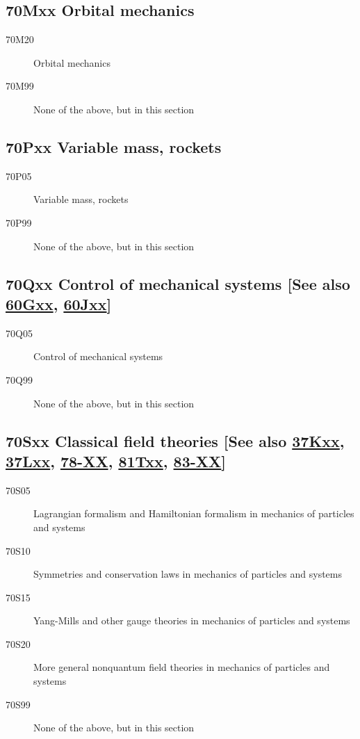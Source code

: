 \subsection*{70Mxx  Orbital mechanics }\label{70Mxx}
\begin{description}  
\item [70M20]\label{70M20} Orbital mechanics
\item [70M99]\label{70M99} None of the above, but in this section
\end{description}
\subsection*{70Pxx  Variable mass, rockets }\label{70Pxx}
\begin{description}  
\item [70P05]\label{70P05} Variable mass, rockets
\item [70P99]\label{70P99} None of the above, but in this section
\end{description}
\subsection*{70Qxx  Control of mechanical systems [See also \hyperref[60Gxx]{60Gxx}, \hyperref[60Jxx]{60Jxx}] }\label{70Qxx}
\begin{description}  
\item [70Q05]\label{70Q05} Control of mechanical systems
\item [70Q99]\label{70Q99} None of the above, but in this section
\end{description}
\subsection*{70Sxx  Classical field theories [See also \hyperref[37Kxx]{37Kxx}, \hyperref[37Lxx]{37Lxx}, \hyperref[78-XX]{78-XX}, \hyperref[81Txx]{81Txx}, \hyperref[83-XX]{83-XX}] }\label{70Sxx}
\begin{description}  
\item [70S05]\label{70S05} Lagrangian formalism and Hamiltonian formalism in mechanics of particles and systems
\item [70S10]\label{70S10} Symmetries and conservation laws in mechanics of particles and systems
\item [70S15]\label{70S15} Yang-Mills and other gauge theories in mechanics of particles and systems
\item [70S20]\label{70S20} More general nonquantum field theories in mechanics of particles and systems
\item [70S99]\label{70S99} None of the above, but in this section
\end{description}
